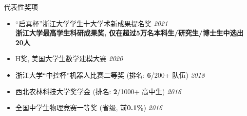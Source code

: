 \documentclass[a4paper]{resume} %
\begin{document}
\begin{rSection}{代表性奖项} 
\begin{itemize}
	\item “启真杯”浙江大学学生十大学术新成果提名奖 \hfill{\it 2021}
	\\ {\bf 浙江大学最高学生科研成果奖, 仅在超过5万名本科生/研究生/博士生中选出20人}
   	\item H奖, 美国大学生数学建模大赛 \hfill{\it 2020}
 	\item 浙江大学“中控杯”机器人比赛二等奖 (排名: {\bf 6}/200+ 队伍) \hfill{\it 2018}
 	\item 西北农林科技大学奖学金 (排名: {\bf 2}/1000+ 高中生) \hfill{\it 2016}
 	\item 全国中学生物理竞赛一等奖 (省级, 前{\bf 0.1\%}) \hfill{\it 2016}
\end{itemize}
\end{rSection}









\end{document}
